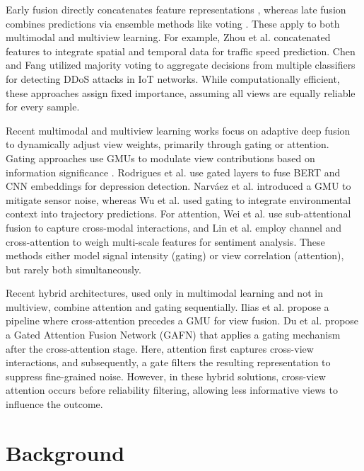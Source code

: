 \documentclass[journal]{IEEEtran}
\begin{document}
Early fusion directly concatenates feature representations \cite{guo2024contrastive,jiang2023multi,yi2022multi}, whereas late fusion combines predictions via ensemble methods like voting \cite{shi2022multi,chen2025detection}. These apply to both multimodal and multiview learning. For example, Zhou et al. \cite{zhou2024large} concatenated features to integrate spatial and temporal data for traffic speed prediction. Chen and Fang \cite{chen2025detection} utilized majority voting to aggregate decisions from multiple classifiers for detecting DDoS attacks in IoT networks. While computationally efficient, these approaches assign fixed importance, assuming all views are equally reliable for every sample.

Recent multimodal and multiview learning works focus on adaptive deep fusion to dynamically adjust view weights, primarily through gating or attention. Gating approaches use GMUs to modulate view contributions based on information significance \cite{rohanian2019gated, arevalo2020gated,cao2023multi}. Rodrigues et al. \cite{rodrigues2019multimodal} use gated layers to fuse BERT and CNN embeddings for depression detection. Narváez et al. \cite{narvaez2023minimal} introduced a GMU to mitigate sensor noise, whereas Wu et al. \cite{wu2024wttfnet} used gating to integrate environmental context into trajectory predictions. For attention, Wei et al. \cite{wei2022subattentional} use sub-attentional fusion to capture cross-modal interactions, and Lin et al. \cite{lin2024m3sa} employ channel and cross-attention to weigh multi-scale features for sentiment analysis. These methods either model signal intensity (gating) or view correlation (attention), but rarely both simultaneously.

Recent hybrid architectures, used only in multimodal learning and not in multiview, combine attention and gating sequentially. Ilias et al. \cite{ilias2024cross} propose a pipeline where cross-attention precedes a GMU for view fusion. Du et al. \cite{du2022gatedattention} propose a Gated Attention Fusion Network (GAFN) that applies a gating mechanism after the cross-attention stage. Here, attention first captures cross-view interactions, and subsequently, a gate filters the resulting representation to suppress fine-grained noise. However, in these hybrid solutions, cross-view attention occurs before reliability filtering, allowing less informative views to influence the outcome.


\section{Background} \label{sec:preliminaries}
\end{document}
